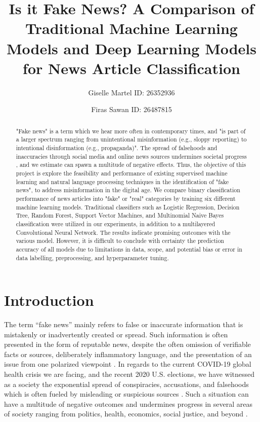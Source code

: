 \documentclass[10pt,twocolumn,letterpaper]{article}
\begin{document}
\title{Is it Fake News? A Comparison of Traditional Machine Learning Models and Deep Learning Models for News Article Classification}
\author{Giselle Martel ID: 26352936 \and Firas Sawan ID: 26487815}
\maketitle
\begin{abstract}
\small
"Fake news" is a term which we hear more often in contemporary times, and "is part of a larger spectrum ranging from unintentional misinformation (e.g., sloppy reporting) to intentional disinformation (e.g., propaganda)"\cite{doi:https://doi.org/10.1002/9781118841570.iejs0128}. The spread of falsehoods and inaccuracies through social media and online news sources undermines societal progress \cite{doi:https://doi.org/10.1002/9781118841570.iejs0128}, and we estimate can spawn a multitude of negative effects. Thus, the objective of this project is explore the feasibility and performance of existing supervised machine learning and natural language processing techniques in the identification of "fake news", to address misinformation in the digital age. We compare binary classification performance of news articles into "fake" or "real" categories by training six different machine learning models. Traditional classifiers such as Logistic Regression, Decision Tree, Random Forest, Support Vector Machines, and Multinomial Naive Bayes classification were utilized in our experiments, in addition to a multilayered Convolutional Neural Network. The results indicate promising outcomes with the various model. However, it is difficult to conclude with certainty the prediction accuracy of all models due to limitations in data, scope, and potential bias or error in data labelling, preprocessing, and hyperparameter tuning. 
\end{abstract} 

\section{Introduction}
\small
The term “fake news” mainly refers to false or inaccurate information that is mistakenly or inadvertently created or spread. Such information is often presented in the form of reputable news, despite the often omission of verifiable facts or sources, deliberately inflammatory language, and the presentation of an issue from one polarized viewpoint \cite{fakenews}. In regards to the current COVID-19 global health crisis we are facing, and the recent 2020 U.S. elections, we have witnessed as a society the exponential spread of conspiracies, accusations, and falsehoods which is often fueled by misleading or suspicious sources \cite{fakenews}. Such a situation can have a multitude of negative outcomes and undermines progress in several areas of society ranging from politics, health, economics, social justice, and beyond \cite{fakenews}.\par
\end{document}
